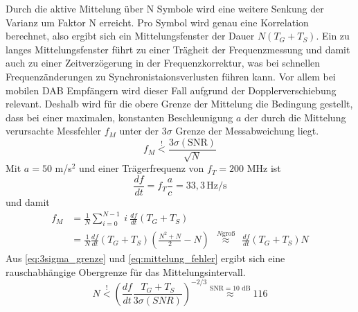 Durch die aktive Mittelung über N Symbole wird eine weitere Senkung der Varianz um Faktor N erreicht. Pro Symbol wird genau eine Korrelation berechnet, also ergibt sich ein Mittelungsfenster der Dauer $N (T_G + T_S)$. Ein zu langes Mittelungsfenster führt zu einer Trägheit der Frequenzmessung und damit auch zu einer Zeitverzögerung in der Frequenzkorrektur, was bei schnellen Frequenzänderungen zu Synchronistaionsverlusten führen kann. Vor allem bei mobilen DAB Empfängern wird dieser Fall aufgrund der Dopplerverschiebung relevant. Deshalb wird für die obere Grenze der Mittelung die Bedingung gestellt, dass bei einer maximalen, konstanten Beschleunigung $a$ der durch die Mittelung verursachte Messfehler $f_M$ unter der $3\sigma$ Grenze der Messabweichung liegt.
\begin{equation}
f_M \overset{!}{<} \frac{3\sigma(\text{SNR})}{\sqrt{N}}
\label{eq:3sigma_grenze}
\end{equation}
Mit $a=50$ m/s$^2$ und einer Trägerfrequenz von $f_T = 200$ MHz ist
\begin{equation}
\frac{df}{dt} = f_T \frac{a}{c} = 33,3\, \text{Hz/s}
\end{equation}
und damit
\begin{equation}
\begin{aligned}
f_M &= \frac{1}{N} \sum \limits_{i=0}^{N-1}\: i \: \frac{df}{dt} (T_G+T_S) \\
&= \frac{1}{N} \frac{df}{dt} (T_G+T_S) \left(\frac{N^2 + N}{2} - N\right) \ \ {\overset{N\text{groß}}{\approx}} \ \  \frac{df}{dt} (T_G+T_S) N
\end{aligned}
\label{eq:mittelung_fehler}
\end{equation}
Aus \ref{eq:3sigma_grenze} und \ref{eq:mittelung_fehler} ergibt sich eine rauschabhängige Obergrenze für das Mittelungsintervall.
\begin{equation}
N \overset{!}{<} \left(\frac{df}{dt}\frac{T_G + T_S}{3 \sigma(SNR)}\right)^{-2/3} \overset{\text{SNR}=10\text{ dB}}{\approx} 116
\end{equation}
